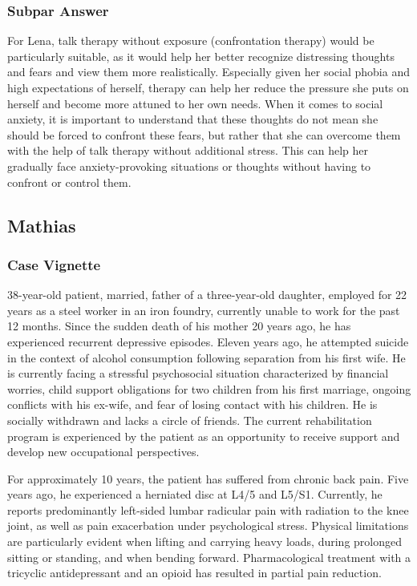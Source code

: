 \documentclass[sigconf,natbib=false]{acmart}
\begin{document}
\subsubsection{Subpar Answer}
For Lena, talk therapy without exposure (confrontation therapy) would be particularly suitable, as it would help her better recognize distressing thoughts and fears and view them more realistically.
Especially given her social phobia and high expectations of herself, therapy can help her reduce the pressure she puts on herself and become more attuned to her own needs.
When it comes to social anxiety, it is important to understand that these thoughts do not mean she should be forced to confront these fears, but rather that she can overcome them with the help of talk therapy without additional stress.
This can help her gradually face anxiety-provoking situations or thoughts without having to confront or control them.

\subsection{Mathias \autocite[p~1]{bar_fallbeispiel_psyche_psychosomatik}}
\label{app:MathiasFull}
\subsubsection{Case Vignette}
38-year-old patient, married, father of a three-year-old daughter, employed for 22 years as a steel worker in an iron foundry, currently unable to work for the past 12 months.
Since the sudden death of his mother 20 years ago, he has experienced recurrent depressive episodes.
Eleven years ago, he attempted suicide in the context of alcohol consumption following separation from his first wife.
He is currently facing a stressful psychosocial situation characterized by financial worries, child support obligations for two children from his first marriage, ongoing conflicts with his ex-wife, and fear of losing contact with his children.
He is socially withdrawn and lacks a circle of friends.
The current rehabilitation program is experienced by the patient as an opportunity to receive support and develop new occupational perspectives.

For approximately 10 years, the patient has suffered from chronic back pain.
Five years ago, he experienced a herniated disc at L4/5 and L5/S1.
Currently, he reports predominantly left-sided lumbar radicular pain with radiation to the knee joint, as well as pain exacerbation under psychological stress.
Physical limitations are particularly evident when lifting and carrying heavy loads, during prolonged sitting or standing, and when bending forward.
Pharmacological treatment with a tricyclic antidepressant and an opioid has resulted in partial pain reduction.
\end{document}
